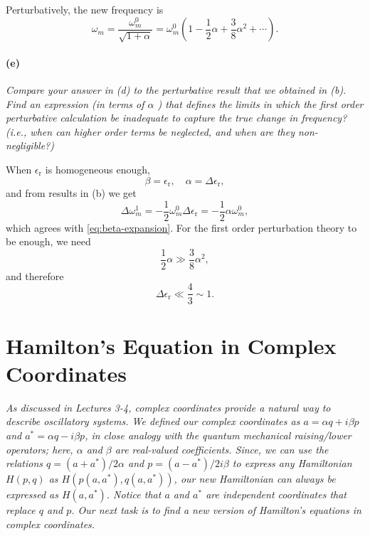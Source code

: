 \documentclass[hyperref, a4paper]{article}
\newcommand{\epsr}{\epsilon_{\text{r}}}
\begin{document}
Perturbatively, the new frequency is 
\begin{equation}
    \omega_m = \frac{\omega_m^0}{\sqrt{1 + \alpha}}
    = \omega_m^0 \left(
        1 - \frac{1}{2} \alpha + \frac{3}{8} \alpha^2 + \cdots
    \right).
    \label{eq:beta-expansion}
\end{equation}

\paragraph*{(e)} \textit{Compare your answer in (d) to the perturbative result that we obtained in (b). Find an expression (in terms of $\alpha$ ) that defines the limits in which the first order perturbative calculation be inadequate to capture the true change in frequency? (i.e., when can higher order terms be neglected, and when are they non-negligible?)} 

When $\epsr$ is homogeneous enough, 
\begin{equation}
    \beta = \epsr, \quad \alpha = \Delta \epsr, 
\end{equation}
and from results in (b) we get 
\begin{equation}
    \Delta \omega_m^1 = - \frac{1}{2} \omega_m^0 \Delta \epsr = - \frac{1}{2} \alpha \omega_m^0 , 
\end{equation} 
which agrees with \eqref{eq:beta-expansion}.
For the first order perturbation theory to be enough, we need
\[
    \frac{1}{2} \alpha \gg \frac{3}{8} \alpha^2,
\]
and therefore 
\begin{equation}
    \Delta \epsr \ll \frac{4}{3} \sim 1.
\end{equation}

\section{Hamilton's Equation in Complex Coordinates}

\textit{
    As discussed in Lectures 3-4, complex coordinates provide a natural way to describe oscillatory systems. We defined our complex coordinates as $a=\alpha q+i \beta p$ and $a^*=\alpha q-i \beta p$, in close analogy with the quantum mechanical raising/lower operators; here, $\alpha$ and $\beta$ are real-valued coefficients. Since, we can use the relations $q=\left(a+a^*\right) / 2 \alpha$ and $p=\left(a-a^*\right) / 2 i \beta$ to express any Hamiltonian $H(p, q)$ as $H\left(p\left(a, a^*\right), q\left(a, a^*\right)\right)$, our new Hamiltonian can always be expressed as $H\left(a, a^*\right)$. Notice that $a$ and $a^*$ are independent coordinates that replace $q$ and $p$. Our next task is to find a new version of Hamilton's equations in complex coordinates.
}
\end{document}
